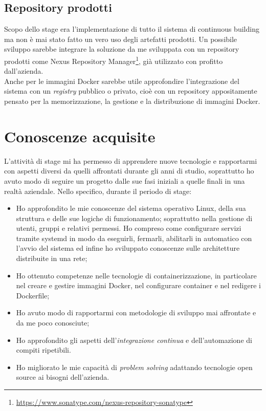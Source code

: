 \subsection{Repository prodotti}

Scopo dello stage era l'implementazione di tutto il sistema di \gls{continuous building} ma non è mai stato fatto un vero uso degli artefatti prodotti. Un possibile sviluppo sarebbe integrare la soluzione da me sviluppata con un \gls{repository} prodotti come Nexus Repository Manager\footnote{\url{https://www.sonatype.com/nexus-repository-sonatype}}, già utilizzato con profitto dall'azienda.\\

Anche per le immagini Docker sarebbe utile approfondire l'integrazione del sistema con un \textit{registry} pubblico o privato, cioè con un repository appositamente pensato per la memorizzazione, la gestione e la distribuzione di immagini Docker.

\section{Conoscenze acquisite}

L'attività di stage mi ha permesso di apprendere nuove tecnologie e rapportarmi con aspetti diversi da quelli affrontati durante gli anni di studio, soprattutto ho avuto modo di seguire un progetto dalle sue fasi iniziali a quelle finali in una realtà aziendale. Nello specifico, durante il periodo di stage:

\begin{itemize}
    \item Ho approfondito le mie conoscenze del sistema operativo \gls{Linux}, della sua struttura e delle sue logiche di funzionamento; soprattutto nella gestione di utenti, gruppi e relativi permessi. Ho compreso come configurare servizi tramite \gls{systemd} in modo da eseguirli, fermarli, abilitarli in automatico con l'avvio del sistema ed infine ho sviluppato conoscenze sulle architetture distribuite in una rete; 
    \item Ho ottenuto competenze nelle tecnologie di containerizzazione, in particolare nel creare e gestire immagini Docker, nel configurare container e nel redigere i Dockerfile;
    \item Ho avuto modo di rapportarmi con metodologie di sviluppo mai affrontate e da me poco conosciute;
    \item Ho approfondito gli aspetti dell'\textit{integrazione continua} e dell'automazione di compiti ripetibili.
    \item Ho migliorato le mie capacità di \textit{problem solving} adattando tecnologie open source ai bisogni dell'azienda.
\end{itemize}

